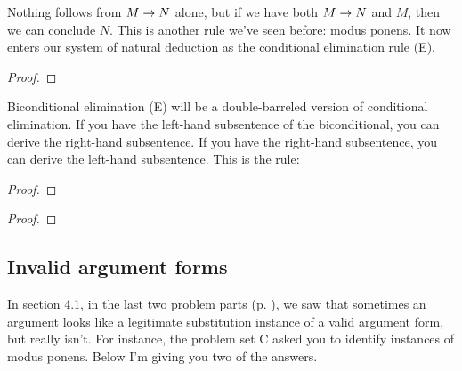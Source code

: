 Nothing follows from $M\rightarrow N$ alone, but if we have both $M \rightarrow N$ and $M$, then we can conclude $N$. This is another rule we've seen before: modus ponens. It now enters our system of natural deduction as the conditional elimination rule ({\eif}E).

\begin{proof}
	 
\end{proof}

Biconditional elimination ({\eiff}E) will be a double-barreled version of conditional elimination. If you have the left-hand subsentence of the biconditional, you can derive the right-hand subsentence. If you have the right-hand subsentence, you can derive the left-hand subsentence. This is the rule:

\begin{multicols}{2}
\begin{proof}
	 
\end{proof}

\begin{proof}
	 
\end{proof}
\end{multicols}

\subsection{Invalid argument forms}


In section 4.1, in the last two problem parts  (p. \pageref{sec4.1partC}), we saw that sometimes an argument looks like a legitimate substitution instance of a valid argument form, but really isn't.  For instance, the problem set C asked you to identify instances of modus ponens. Below I'm giving you two of the answers.
 
